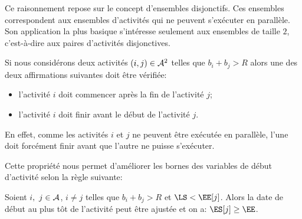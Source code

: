 Ce raisonnement repose sur le concept d'ensembles disjonctifs. Ces
ensembles correspondent aux ensembles d'activités qui ne peuvent
s'exécuter en parallèle. Son application la plus basique s'intéresse
seulement aux ensembles de taille $2$, c'est-à-dire aux paires
d'activités disjonctives. 

Si nous considérons deux activités $(i,j) \in {\cal A}^2$ telles que
$b_i+b_j > R$ alors une des deux affirmations suivantes doit être
vérifiée:
\begin{itemize}
\item l'activité $i$ doit commencer après la fin de l'activité $j$;
\item l'activité $i$ doit finir avant le début de l'activité $j$.
\end{itemize}
En effet, comme les activités $i$ et $j$ ne peuvent être exécutée en
parallèle, l'une doit forcément finir avant que l'autre ne puisse
s'exécuter.

Cette propriété nous permet d'améliorer les bornes des variables de
début d'activité selon la règle suivante:
\begin{reg}
  Soient $i,\ j \in {\cal A}$, $i\neq j$ telles que $b_i+b_j > R$ et $\LS
  <\EE[j]$. Alors la date de début au plus tôt de l'activité peut
  être ajustée et on a: $ \ES[j] \ge \EE$. 
\end{reg}

